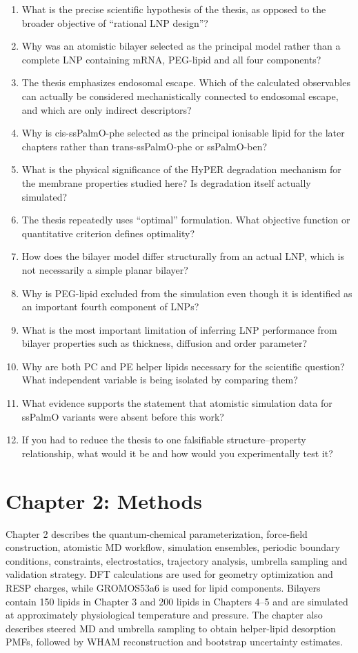 \documentclass[11pt,a4paper]{article}
\begin{document}
\begin{enumerate}[leftmargin=*]
\item What is the precise scientific hypothesis of the thesis, as opposed to the broader objective of ``rational LNP design''?
\item Why was an atomistic bilayer selected as the principal model rather than a complete LNP containing mRNA, PEG-lipid and all four components?
\item The thesis emphasizes endosomal escape. Which of the calculated observables can actually be considered mechanistically connected to endosomal escape, and which are only indirect descriptors?
\item Why is cis-ssPalmO-phe selected as the principal ionisable lipid for the later chapters rather than trans-ssPalmO-phe or ssPalmO-ben?
\item What is the physical significance of the HyPER degradation mechanism for the membrane properties studied here? Is degradation itself actually simulated?
\item The thesis repeatedly uses ``optimal'' formulation. What objective function or quantitative criterion defines optimality?
\item How does the bilayer model differ structurally from an actual LNP, which is not necessarily a simple planar bilayer?
\item Why is PEG-lipid excluded from the simulation even though it is identified as an important fourth component of LNPs?
\item What is the most important limitation of inferring LNP performance from bilayer properties such as thickness, diffusion and order parameter?
\item Why are both PC and PE helper lipids necessary for the scientific question? What independent variable is being isolated by comparing them?
\item What evidence supports the statement that atomistic simulation data for ssPalmO variants were absent before this work?
\item If you had to reduce the thesis to one falsifiable structure--property relationship, what would it be and how would you experimentally test it?
\end{enumerate}

\section{Chapter 2: Methods}

Chapter 2 describes the quantum-chemical parameterization, force-field construction, atomistic MD workflow, simulation ensembles, periodic boundary conditions, constraints, electrostatics, trajectory analysis, umbrella sampling and validation strategy. DFT calculations are used for geometry optimization and RESP charges, while GROMOS53a6 is used for lipid components. Bilayers contain 150 lipids in Chapter 3 and 200 lipids in Chapters 4--5 and are simulated at approximately physiological temperature and pressure. The chapter also describes steered MD and umbrella sampling to obtain helper-lipid desorption PMFs, followed by WHAM reconstruction and bootstrap uncertainty estimates.
\end{document}
